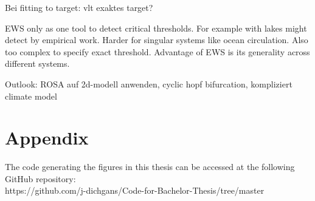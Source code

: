 \documentclass[%
thesis=student,%
coverpage=false,%
titlepage=false,%
headmarks=true, %
english,%
font=libertine, %
math=newpxtx, %
BCOR=5mm,%
coverBCOR=11mm%
]{tumbook}
\begin{document}
Bei fitting to target: vlt exaktes target?


EWS only as one tool to detect critical thresholds. For example with lakes might detect by empirical work. Harder for singular systems like ocean circulation. Also too complex to specify exact threshold. Advantage of EWS is its generality across different systems.

Outlook: ROSA auf 2d-modell anwenden, cyclic hopf bifurcation, kompliziert climate model



\appendix
\chapter{Appendix}
The code generating the figures in this thesis can be accessed at the following GitHub repository: \\
https://github.com/j-dichgans/Code-for-Bachelor-Thesis/tree/master


\backmatter{}
\listoffigures%
\listoftables%

\nocite{Alspach:2008,GaleShapley:1962} %
\printbibliography{} %
\end{document}
